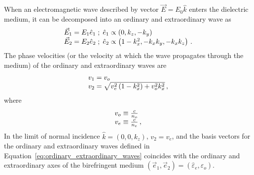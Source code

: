 When an electromagnetic wave described by vector $\vec{E} = E_{0} \hat{k}$ enters the dielectric medium, it can be decomposed into an ordinary and extraordinary wave as
\begin{equation}
    \begin{array}{r@{}l}
    \vec{E}_{1} &{}= E_{1} \hat{e}_{1} \; ; \; \hat{e}_{1} \propto \left( 0, k_{z}, -k_{y} \right) \\
    \vec{E}_{2} &{}= E_{2} \hat{e}_{2} \; ; \; \hat{e}_{2} \propto \left( 1 - k_{x}^{2}, -k_{x} k_{y}, -k_{x} k_{z} \right) \, .
    \end{array}
    \label{eq:ordinary_extraordinary_waves}
\end{equation}
The phase velocities (or the velocity at which the wave propagates through the medium) of the ordinary and extraordinary waves are
\begin{equation}
    \begin{array}{r@{}l}
    v_{1} &{}= v_{o} \\
    v_{2} &{}= \sqrt{v_{e}^{2} \left( 1 - k_{x}^{2} \right) + v_{o}^{2} k_{x}^{2}} \, ,
    \end{array}
    \label{eq:ordinary_extraordinary_wave_velocities}
\end{equation}
where
\begin{equation}
    \begin{array}{r@{}l}
    v_{o} &{}\equiv \frac{c}{n_{o}} \\
    v_{e} &{}\equiv \frac{c}{n_{e}} \, ,
    \end{array}
    \label{eq:ordinary_extraordinary_axes_velocities}
\end{equation}
In the limit of normal incidence $\hat{k} = (0, 0, k_{z})$, $v_{2} = v_{e}$, and the basis vectors for the ordinary and extraordinary waves defined in Equation~\ref{eq:ordinary_extraordinary_waves} coincides with the ordinary and extraordinary axes of the birefringent medium $(\vec{e}_{1}, \vec{e}_{2}) = (\hat{\varepsilon}_{e}, \hat{\varepsilon}_{o})$.

